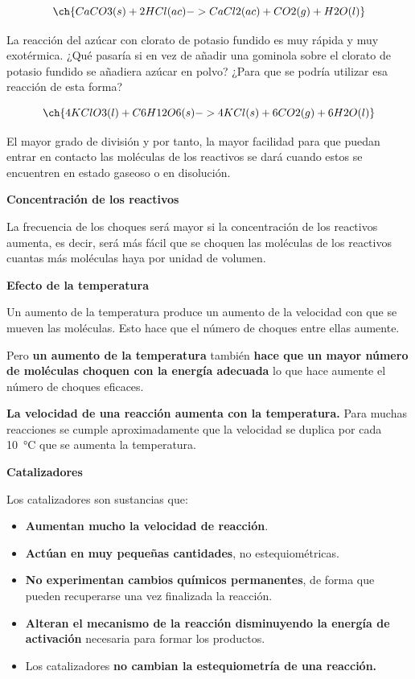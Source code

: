 \documentclass[
  spanish,
]{article}
\providecommand{\tightlist}{%
  \setlength{\itemsep}{0pt}\setlength{\parskip}{0pt}}
\begin{document}
\[\ch{CaCO3 (s) + 2 HCl (ac) -> CaCl2 (ac) + CO2 (g) + H2O (l)}\]

La reacción del azúcar con clorato de potasio fundido es muy rápida y
muy exotérmica. ¿Qué pasaría si en vez de añadir una gominola sobre el
clorato de potasio fundido se añadiera azúcar en polvo? ¿Para que se
podría utilizar esa reacción de esta forma?

\[\ch{4 KClO3 (l) + C6H12O6 (s) -> 4 KCl (s) + 6 CO2 (g) + 6 H2O (l)}\]

El mayor grado de división y por tanto, la mayor facilidad para que
puedan entrar en contacto las moléculas de los reactivos se dará cuando
estos se encuentren en estado gaseoso o en disolución.

\textbf{Concentración de los reactivos}

\hfill{}

La frecuencia de los choques será mayor si la concentración de los
reactivos aumenta, es decir, será más fácil que se choquen las moléculas
de los reactivos cuantas más moléculas haya por unidad de volumen.

\textbf{Efecto de la temperatura}

Un aumento de la temperatura produce un aumento de la velocidad con que
se mueven las moléculas. Esto hace que el número de choques entre ellas
aumente.

Pero \textbf{un aumento de la temperatura} también \textbf{hace que un
mayor número de moléculas choquen con la energía adecuada} lo que hace
aumente el número de choques eficaces.

\textbf{La velocidad de una reacción aumenta con la temperatura.} Para
muchas reacciones se cumple aproximadamente que la velocidad se duplica
por cada \qty{10}{\degreeCelsius} que se aumenta la temperatura.

\textbf{Catalizadores}

Los catalizadores son sustancias que:

\begin{itemize}
\tightlist
\item
  \textbf{Aumentan mucho la velocidad de reacción}.
\item
  \textbf{Actúan en muy pequeñas cantidades}, no estequiométricas.
\item
  \textbf{No experimentan cambios químicos permanentes}, de forma que
  pueden recuperarse una vez finalizada la reacción.
\item
  \textbf{Alteran el mecanismo de la reacción disminuyendo la energía de
  activación} necesaria para formar los productos.
\item
  Los catalizadores \textbf{no cambian la estequiometría de una
  reacción.}
\end{itemize}
\end{document}
